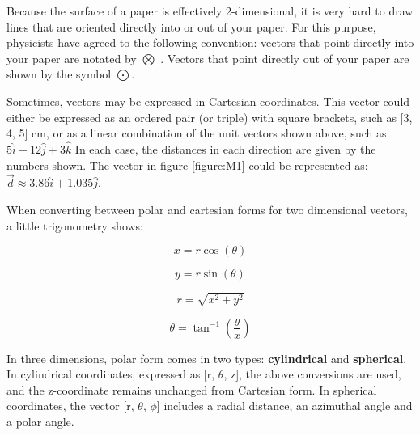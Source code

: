 	
	Because the surface of a paper is effectively 2-dimensional, it is very hard to draw lines that are oriented directly into or out of your paper. For this purpose, physicists have agreed to the following convention: vectors that point directly into your paper are notated by $\bigotimes$ .  Vectors that point directly out of your paper are shown by the symbol $\bigodot$.  
	
	Sometimes, vectors may be expressed in Cartesian coordinates.  This vector could either be expressed as an ordered pair (or triple) with square brackets, such as [3, 4, 5] cm, or as a linear combination of the unit vectors shown above, such as $5\hat{i} + 12 \hat{j} + 3 \hat{k}$  In each case, the distances in each direction are given by the numbers shown.  The vector in figure \ref{figure:M1} could be represented as: \color{blue} $\vec{d}  \approx 3.86 \hat{i} + 1.035 \hat{j}$.  \color{black}
	
	When converting between polar and cartesian forms for two dimensional vectors, a little trigonometry shows: 
		\begin{mdframed}[backgroundcolor=orange!20!white]
	
	\color{blue}
	\begin{multicols}{2}
		\begin{center}
			\begin{equation}
			x = r \cos(\theta)
			\label{eq11}
			\end{equation}
			
			\begin{equation}
			y = r \sin(\theta)
			\end{equation}

			\begin{equation}
			r = \sqrt{x^2+y^2}			
			\end{equation}

			\begin{equation}
			\theta=\tan^{-1}(\frac{y}{x})
			\label{eq14}
			\end{equation}		
		\end{center}
	\end{multicols}
	\color{black}
	\end{mdframed}
	
	In three dimensions, polar form comes in two types: \textbf{cylindrical} and \textbf{spherical}.  In cylindrical coordinates, expressed as [r, $\theta$, z],  the above conversions are used, and the z-coordinate remains unchanged from Cartesian form.  In spherical coordinates, the vector [r, $\theta$, $\phi$] includes a radial distance, an azimuthal angle and a polar angle. 

